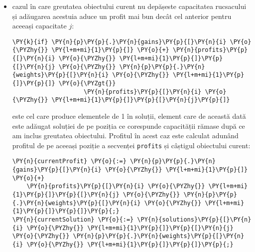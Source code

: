 \begin{sloppypar}
\begin{itemize}
        \begin{Verbatim}[commandchars=\\\{\}]
\PY{n}{currentProfit} \PY{o}{:=} \PY{n}{profits}\PY{p}{[}\PY{n}{i} \PY{o}{\PYZhy{}} \PY{l+m+mi}{1}\PY{p}{]}\PY{p}{[}\PY{n}{j}\PY{p}{]}\PY{p}{;}
\PY{n}{currentSolution} \PY{o}{:=} \PY{n}{solutions}\PY{p}{[}\PY{n}{i} \PY{o}{\PYZhy{}} \PY{l+m+mi}{1}\PY{p}{]}\PY{p}{[}\PY{n}{j}\PY{p}{]}\PY{p}{;}
\PY{n}{currentSolution} \PY{o}{:=} \PY{n}{currentSolution} \PY{o}{+} \PY{p}{[}\PY{l+m+mi}{0}\PY{p}{]}\PY{p}{;}
\end{Verbatim}
        Acest caz este tratat în metoda \texttt{solvesAdd0TooBig}.
        \item cazul în care greutatea obiectului curent nu depășeste capacitatea rucsacului și adăugarea acestuia aduce un profit mai bun decât cel anterior pentru aceeași capacitate $j$:
        \begin{Verbatim}[commandchars=\\\{\}]
 \PY{k}{if} \PY{n}{p}\PY{p}{.}\PY{n}{gains}\PY{p}{[}\PY{n}{i} \PY{o}{\PYZhy{}} \PY{l+m+mi}{1}\PY{p}{]} \PY{o}{+} \PY{n}{profits}\PY{p}{[}\PY{n}{i} \PY{o}{\PYZhy{}} \PY{l+m+mi}{1}\PY{p}{]}\PY{p}{[}\PY{n}{j} \PY{o}{\PYZhy{}} \PY{n}{p}\PY{p}{.}\PY{n}{weights}\PY{p}{[}\PY{n}{i} \PY{o}{\PYZhy{}} \PY{l+m+mi}{1}\PY{p}{]}\PY{p}{]} \PY{o}{\PYZgt{}} 
                    \PY{n}{profits}\PY{p}{[}\PY{n}{i} \PY{o}{\PYZhy{}} \PY{l+m+mi}{1}\PY{p}{]}\PY{p}{[}\PY{n}{j}\PY{p}{]}
\end{Verbatim}
        este cel care produce elementele de 1 în soluții, element care de această dată este adăugat soluției de pe poziția ce corespunde capacității rămase după ce am inclus greutatea obiectului. Profitul în acest caz este calculat adunând profitul de pe aceeași poziție a secvenței \texttt{profits} și câștigul obiectului curent:
        \begin{Verbatim}[commandchars=\\\{\}]
\PY{n}{currentProfit} \PY{o}{:=} \PY{n}{p}\PY{p}{.}\PY{n}{gains}\PY{p}{[}\PY{n}{i} \PY{o}{\PYZhy{}} \PY{l+m+mi}{1}\PY{p}{]} \PY{o}{+} 
    \PY{n}{profits}\PY{p}{[}\PY{n}{i} \PY{o}{\PYZhy{}} \PY{l+m+mi}{1}\PY{p}{]}\PY{p}{[}\PY{n}{j} \PY{o}{\PYZhy{}} \PY{n}{p}\PY{p}{.}\PY{n}{weights}\PY{p}{[}\PY{n}{i} \PY{o}{\PYZhy{}} \PY{l+m+mi}{1}\PY{p}{]}\PY{p}{]}\PY{p}{;}
\PY{n}{currentSolution} \PY{o}{:=} \PY{n}{solutions}\PY{p}{[}\PY{n}{i} \PY{o}{\PYZhy{}} \PY{l+m+mi}{1}\PY{p}{]}\PY{p}{[}\PY{n}{j} \PY{o}{\PYZhy{}} \PY{n}{p}\PY{p}{.}\PY{n}{weights}\PY{p}{[}\PY{n}{i} \PY{o}{\PYZhy{}} \PY{l+m+mi}{1}\PY{p}{]}\PY{p}{]}\PY{p}{;}

\end{Verbatim}
\end{itemize}
\end{sloppypar}
